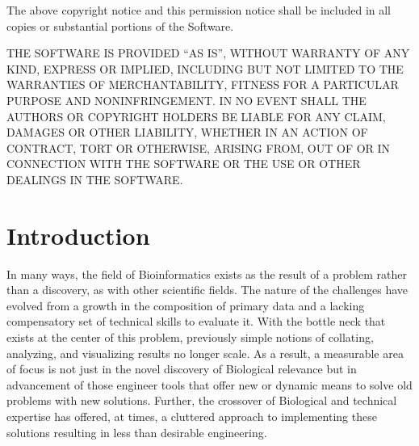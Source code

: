 \documentclass[10pt]{report}
\begin{document}
The above copyright notice and this permission notice shall be included in all copies or substantial portions of the Software.

THE SOFTWARE IS PROVIDED ``AS IS'', WITHOUT WARRANTY OF ANY KIND, EXPRESS OR IMPLIED, INCLUDING BUT NOT LIMITED TO THE WARRANTIES OF MERCHANTABILITY, FITNESS FOR A PARTICULAR PURPOSE AND NONINFRINGEMENT\@. IN NO EVENT SHALL THE AUTHORS OR COPYRIGHT HOLDERS BE LIABLE FOR ANY CLAIM, DAMAGES OR OTHER LIABILITY, WHETHER IN AN ACTION OF CONTRACT, TORT OR OTHERWISE, ARISING FROM, OUT OF OR IN CONNECTION WITH THE SOFTWARE OR THE USE OR OTHER DEALINGS IN THE SOFTWARE\@.

{}
%
%
%
%
%

\tableofcontents
{}
\listoftables
{}
\listoffigures

\newpage






\chapter{Introduction}
In many ways, the field of Bioinformatics exists as the result of a problem rather than a discovery, as with other scientific fields. The nature of the challenges have evolved from a growth in the composition of primary data and a lacking compensatory set of technical skills to evaluate it. With the bottle neck that exists at the center of this problem, previously simple notions of collating, analyzing, and visualizing results no longer scale. As a result, a measurable area of focus is not just in the novel discovery of Biological relevance but in advancement of those engineer tools that offer new or dynamic means to solve old problems with new solutions. Further, the crossover of Biological and technical expertise has offered, at times, a cluttered approach to implementing these solutions resulting in less than desirable engineering.
\end{document}
